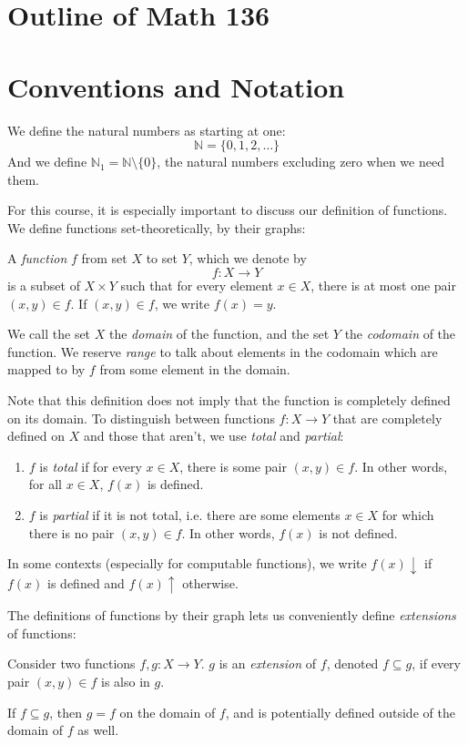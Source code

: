 \section{Outline of Math 136}
\section{Conventions and Notation}
We define the natural numbers as starting at one: \[
    \mathbb{N} = \{ 0, 1, 2, \ldots \}
\]
And we define $\mathbb{N}_1 = \mathbb{N} \setminus \{ 0 \}$, the natural numbers excluding zero when we need them.

For this course, it is especially important to discuss our definition of functions. We define functions set-theoretically, by their graphs:

\begin{definition}
A \textit{function} $f$ from set $X$ to set $Y$, which we denote by \[f \colon X \rightarrow Y\] is a subset of $X \times Y$ such that for every element $x \in X$, there is at most one pair $(x, y) \in f$. If $(x, y) \in f$, we write $f(x) = y$.
\end{definition}

We call the set $X$ the \textit{domain} of the function, and the set $Y$ the \textit{codomain} of the function. We reserve \textit{range} to talk about elements in the codomain which are mapped to by $f$ from some element in the domain.

Note that this definition does not imply that the function is completely defined on its domain. To distinguish between functions $f \colon X \rightarrow Y$ that are completely defined on $X$ and those that aren't, we use \textit{total} and \textit{partial}:
\begin{enumerate}
    \item $f$ is \textit{total} if for every $x \in X$, there is some pair $(x, y) \in f$. In other words, for all $x \in X$, $f(x)$ is defined.
    \item $f$ is \textit{partial} if it is not total, i.e. there are some elements $x \in X$ for which there is no pair $(x, y) \in f$. In other words, $f(x)$ is not defined.
\end{enumerate}

In some contexts (especially for computable functions), we write $f(x) \downarrow$ if $f(x)$ is defined and $f(x) \uparrow$ otherwise.

The definitions of functions by their graph lets us conveniently define \textit{extensions} of functions:

\begin{definition}
Consider two functions $f, g \colon X \rightarrow Y$. $g$ is an \textit{extension} of $f$, denoted $f \subseteq g$, if every pair $(x, y) \in f$ is also in $g$.
\end{definition}

If $f \subseteq g$, then $g = f$ on the domain of $f$, and is potentially defined outside of the domain of $f$ as well.

